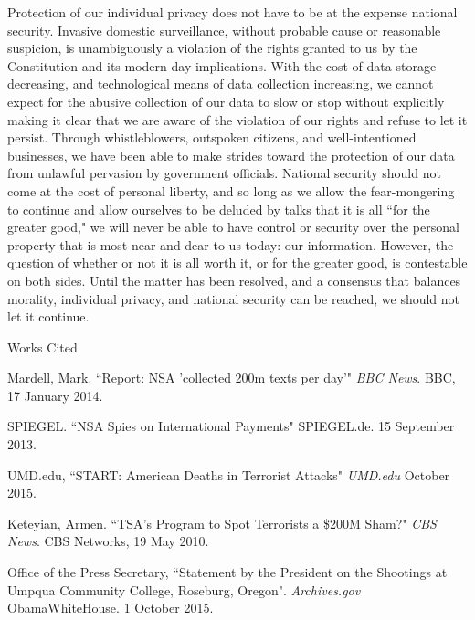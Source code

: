 \documentclass[12pt]{article}
\newcommand{\bibent}{\noindent \hangindent 40pt}
\newenvironment{workscited}{\newpage \begin{center} Works Cited \end{center}}
{\newpage}
\begin{document}
\begin{flushleft}
    \par Protection of our individual privacy does not have to be at the expense 
    national security. Invasive domestic surveillance, without probable cause or 
    reasonable suspicion, is unambiguously a violation of the rights granted to 
    us by the Constitution and its modern-day implications. With the cost of 
    data storage decreasing, and technological means of data collection 
    increasing, we cannot expect for the abusive collection of our data to slow 
    or stop without explicitly making it clear that we are aware of the 
    violation of our rights and refuse to let it persist. Through 
    whistleblowers, outspoken citizens, and well-intentioned businesses, we have 
    been able to make strides toward the protection of our data from unlawful 
    pervasion by government officials. National security should not come at the 
    cost of personal liberty, and so long as we allow the fear-mongering to 
    continue and allow ourselves to be deluded by talks that it is all ``for the 
    greater good," we will never be able to have control or security over the 
    personal property that is most near and dear to us today: our information.  
    However, the question of whether or not it is all worth it, or for the 
    greater good, is contestable on both sides. Until the matter has been 
    resolved, and a consensus that balances morality, individual privacy, and 
    national security can be reached, we should not let it continue. 


    \begin{workscited}
        \bibent
        Mardell, Mark. ``Report: NSA 'collected 200m texts per day'" \textit{BBC 
        News}. BBC, 17 January 2014.

        \bibent
        SPIEGEL. ``NSA Spies on International Payments" SPIEGEL.de. 15 September 
        2013.

       \bibent
       UMD.edu, ``START: American Deaths in Terrorist Attacks" \textit{UMD.edu} 
       October 2015.

       \bibent
       Keteyian, Armen. ``TSA's Program to Spot Terrorists a \$200M Sham?" 
       \textit{CBS News}. CBS Networks, 19 May 2010.

       \bibent
       Office of the Press Secretary, ``Statement by the President on the 
       Shootings at Umpqua Community College, Roseburg, Oregon". 
       \textit{Archives.gov} ObamaWhiteHouse. 1 October 2015.
    
    \end{workscited}
\end{flushleft}
\end{document}

